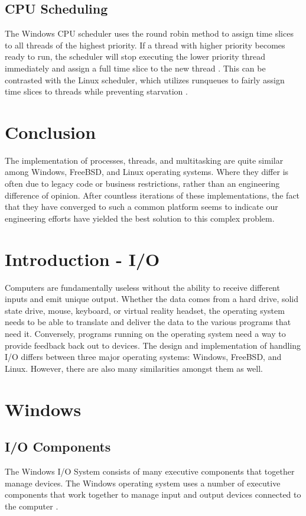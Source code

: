 \documentclass[letterpaper,draftclsnofoot,10pt,onecolumn,titlepage]{IEEEtran}\usepackage[margin=0.75in]{geometry}
\begin{document}
    \subsection{CPU Scheduling}
    The Windows CPU scheduler uses the round robin method to assign time slices to all threads of the highest 
    priority. If a thread with higher priority becomes ready to run, the scheduler will stop executing the lower
    priority thread immediately and assign a full time slice to the new thread \cite{windowsprocesses}. This can 
    be contrasted with the Linux scheduler, which utilizes runqueues to fairly assign time slices to threads 
    while preventing starvation \cite{linuxscheduler}.
    
    
\section{Conclusion}
The implementation of processes, threads, and multitasking are quite similar among Windows, FreeBSD, and Linux 
operating systems. Where they differ is often due to legacy code or business restrictions, rather than an 
engineering difference of opinion. After countless iterations of these implementations, the fact that they 
have converged to such a common platform seems to indicate our engineering efforts have yielded the best 
solution to this complex problem.



\section{Introduction - I/O}
Computers are fundamentally useless without the ability to receive different inputs and emit unique output.
Whether the data comes from a hard drive, solid state drive, mouse, keyboard, or virtual reality headset,
the operating system needs to be able to translate and deliver the data to the various programs that need
it. Conversely, programs running on the operating system need a way to provide feedback back out to 
devices. The design and implementation of handling I/O differs between three major operating systems: Windows,
FreeBSD, and Linux. However, there are also many similarities amongst them as well.

\section{Windows}
 
\subsection{I/O Components}
The Windows I/O System consists of many executive components that together manage devices.
The Windows operating system uses a number of executive components that work together to manage input and 
output devices connected to the computer \cite{windows}.
\end{document}
